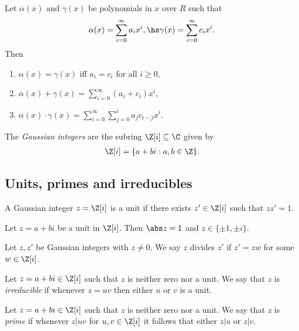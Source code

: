 \documentclass{article}
\begin{document}
\begin{definition}
	Let $\alpha(x)$ and $\gamma(x)$ be polynomials in $x$ over $R$ such that
	\begin{align*}
		\alpha(x)=\sum_{i=0}^\infty a_ix^i,\hs
		\gamma(x)=\sum_{i=0}^\infty c_ix^i.
	\end{align*}
	Then \begin{enumerate}
		\item $\alpha(x)=\gamma(x)$ iff $a_i=c_i$ for all $i\geq 0$,
		\item $\alpha(x)+\gamma(x)=\sum_{i=0}^\infty (a_i+c_i)x^i$,
		\item $\alpha(x)\cdot\gamma(x)=\sum_{i=0}^\infty \sum_{j=0}^i a_jc_{i-j}x^i$.
	\end{enumerate}
\end{definition}

\begin{definition}
	The \emph{Gaussian integers} are the subring $\Z[i]\subseteq\C$ given by
	\begin{align*}
		\Z[i]=\{a+bi:a,b\in\Z\}.
	\end{align*}
\end{definition}

\subsection{Units, primes and irreducibles}

\begin{definition}
	A Gaussian integer $z=\Z[i]$ is a unit if there exists $z'\in\Z[i]$ such that
	$zz'=1$.
\end{definition}

\begin{lemma}[Lecture 13]
	Let $z=a+bi$ be a unit in $\Z[i]$. Then $\abs z=1$ and $z\in\{\pm 1, \pm i\}$.
\end{lemma}

\begin{definition}
	Let $z,z'$ be Gaussian integers with $z\not=0$. We say $z$ divides $z'$ if $z'=zw$ for
	some $w\in\Z[i]$.
\end{definition}

\begin{definition}[Irreducibles]
	Let $z=a+bi\in\Z[i]$ such that $z$ is neither zero nor a unit. We say that $z$ is \emph{irreducible}
	if whenever $z=uv$ then either $u$ or $v$ is a unit.
\end{definition}

\begin{definition}
	Let $z=a+bi\in\Z[i]$ such that $z$ is neither zero nor a unit. We say that $z$ is \emph{prime} if
	whenever $z|uv$ for $u,v\in\Z[i]$ it follows that either $z|u$ or $z|v$.
\end{definition}
\end{document}
